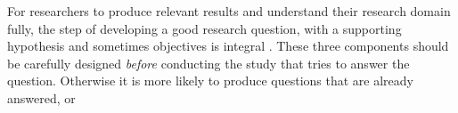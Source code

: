 For researchers to produce relevant results and understand their research domain fully, the step of developing a good research question, with a supporting hypothesis and sometimes objectives is integral \cite{Farrugia2009}. These three components should be carefully designed \emph{before} conducting the study that tries to answer the question. Otherwise it is more likely to produce questions that are already answered, or  \cite[p. 280]{Farrugia2009} 



